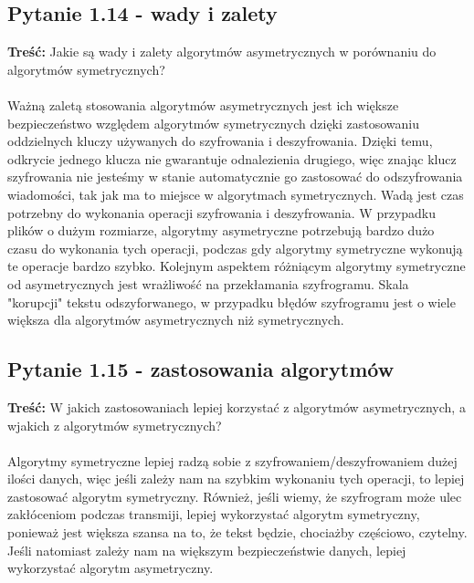 \documentclass{article}
\begin{document}
\subsection{Pytanie 1.14 - wady i zalety}
\textbf{Treść: } Jakie są wady i zalety algorytmów asymetrycznych w porównaniu do algorytmów symetrycznych? \\\\
Ważną zaletą stosowania algorytmów asymetrycznych jest ich większe bezpieczeństwo względem algorytmów symetrycznych dzięki zastosowaniu oddzielnych kluczy używanych do szyfrowania i deszyfrowania.
Dzięki temu, odkrycie jednego klucza nie gwarantuje odnalezienia drugiego, więc znając klucz szyfrowania nie jesteśmy w stanie automatycznie go zastosować do odszyfrowania wiadomości, tak jak ma to miejsce w algorytmach symetrycznych.
Wadą jest czas potrzebny do wykonania operacji szyfrowania i deszyfrowania. W przypadku plików o dużym rozmiarze, algorytmy asymetryczne potrzebują bardzo dużo czasu do wykonania tych operacji, podczas gdy algorytmy symetryczne wykonują te operacje bardzo szybko.
Kolejnym aspektem różniącym algorytmy symetryczne od asymetrycznych jest wrażliwość na przekłamania szyfrogramu. Skala "korupcji" tekstu odszyforwanego, w przypadku błędów szyfrogramu jest o wiele większa dla algorytmów asymetrycznych niż symetrycznych.
\subsection{Pytanie 1.15 - zastosowania algorytmów}
\textbf{Treść: } W jakich zastosowaniach lepiej korzystać z algorytmów asymetrycznych, a wjakich z algorytmów symetrycznych? \\\\
Algorytmy symetryczne lepiej radzą sobie z szyfrowaniem/deszyfrowaniem dużej ilości danych, więc jeśli zależy nam na szybkim wykonaniu tych operacji, to lepiej zastosować algorytm symetryczny. Również, jeśli wiemy, że szyfrogram może ulec zakłóceniom podczas transmiji, lepiej wykorzystać algorytm symetryczny,
ponieważ jest większa szansa na to, że tekst będzie, chociażby częściowo, czytelny. Jeśli natomiast zależy nam na większym bezpieczeństwie danych, lepiej wykorzystać algorytm asymetryczny.
\end{document}
